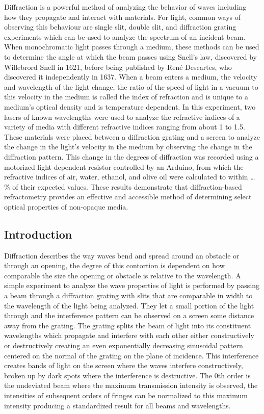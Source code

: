 \documentclass[11pt]{article}
\begin{document}
    Diffraction is a powerful method of analyzing the behavior of waves
including how they propagate and interact with materials. For light,
common ways of observing this behaviour are single slit, double slit,
and diffraction grating experiments which can be used to analyze the
spectrum of an incident beam. When monochromatic light passes through a
medium, these methods can be used to determine the angle at which the
beam passes using Snell's law, discovered by Willebrord Snell in 1621,
before being published by René Descartes, who discovered it
independently in 1637. When a beam enters a medium, the velocity and
wavelength of the light change, the ratio of the speed of light in a
vacuum to this velocity in the medium is called the index of refraction
and is unique to a medium's optical density and is temperature
dependent. In this experiment, two lasers of known wavelengths were used
to analyze the refractive indices of a variety of media with different
refractive indices ranging from about 1 to 1.5. These materials were
placed between a diffraction grating and a screen to analyze the change
in the light's velocity in the medium by observing the change in the
diffraction pattern. This change in the degrees of diffraction was
recorded using a motorized light-dependent resistor controlled by an
Arduino, from which the refractive indices of air, water, ethanol, and
olive oil were calculated to within \ldots\% of their expected values.
These results demonstrate that diffraction-based refractometry provides
an effective and accessible method of determining select optical
properties of non-opaque media.

    \hypertarget{introduction}{%
\subsection{Introduction}\label{introduction}}

    Diffraction describes the way waves bend and spread around an obstacle
or through an opening, the degree of this contortion is dependent on how
comparable the size the opening or obstacle is relative to the
wavelength. A simple experiment to analyze the wave properties of light
is performed by passing a beam through a diffraction grating with slits
that are comparable in width to the wavelength of the light being
analyzed. They let a small portion of the light through and the
interference pattern can be observed on a screen some distance away from
the grating. The grating splits the beam of light into its constituent
wavelengths which propagate and interfere with each other either
constructively or destructively creating an even exponentially
decreasing sinusoidal pattern centered on the normal of the grating on
the plane of incidence. This interference creates bands of light on the
screen where the waves interfere constructively, broken up by dark spots
where the interference is destructive. The 0th order is the undeviated
beam where the maximum transmission intensity is observed, the
intensities of subsequent orders of fringes can be normalized to this
maximum intensity producing a standardized result for all beams and
wavelengths.
\end{document}
